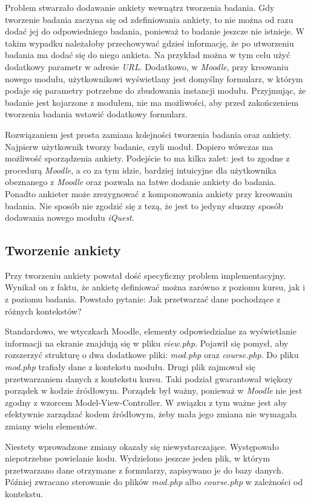 \documentclass[12pt]{article}
\begin{document}
Problem stwarzało dodawanie ankiety wewnątrz tworzenia badania. Gdy tworzenie badania zaczyna się od zdefiniowania ankiety, to nie można od razu dodać jej do odpowiedniego badania, ponieważ to badanie jeszcze nie istnieje. W takim wypadku należałoby przechowywać gdzieś informację, że po utworzeniu badania ma dodać się do niego ankieta. Na przykład można w tym celu użyć dodatkowy parametr w adresie \emph{URL}. Dodatkowo, w \emph{Moodle}, przy kreowaniu nowego modułu, użytkownikowi wyświetlany jest domyślny formularz, w którym podaje się parametry potrzebne do zbudowania instancji modułu. Przyjmując, że badanie jest kojarzone z modułem, nie ma możliwości, aby przed zakończeniem tworzenia badania wstawić dodatkowy formularz.

Rozwiązaniem jest prosta zamiana kolejności tworzenia badania oraz ankiety. Najpierw użytkownik tworzy badanie, czyli moduł. Dopiero wówczas ma możliwość sporządzenia ankiety. Podejście to ma kilka zalet: jest to zgodne z procedurą \emph{Moodle}, a co za tym idzie, bardziej intuicyjne dla użytkownika obeznanego z \emph{Moodle} oraz pozwala na łatwe dodanie ankiety do badania. Ponadto ankieter może zrezygnować z komponowania ankiety przy kreowaniu badania. Nie sposób nie zgodzić się z tezą, że jest to jedyny słuszny sposób dodawania nowego modułu \emph{iQuest}.

\subsection{Tworzenie ankiety}
Przy tworzeniu ankiety powstał dość specyficzny problem implementacyjny. Wynikał on z faktu, że ankietę definiować można zarówno z poziomu kursu, jak i z poziomu badania. Powstało pytanie: Jak przetwarzać dane pochodzące z różnych kontekstów? 

Standardowo, we wtyczkach Moodle, elementy odpowiedzialne za wyświetlanie informacji na ekranie znajdują się w pliku \emph{view.php}. Pojawił się pomysł, aby rozszerzyć strukturę o dwa dodatkowe pliki: \emph{mod.php} oraz \emph{course.php}. Do pliku \emph{mod.php} trafiały dane z kontekstu modułu. Drugi plik zajmował się przetwarzaniem danych z kontekstu kursu. Taki podział gwarantował większy porządek w kodzie źródłowym. Porządek był ważny, ponieważ w \emph{Moodle} nie jest zgodny z wzorcem Model-View-Controller. W związku z tym ważne jest aby efektywnie zarządzać kodem źródłowym, żeby mała jego zmiana nie wymagała zmiany wielu elementów.

Niestety wprowadzone zmiany okazały się niewystarczające. Występowało niepotrzebne powielanie kodu. Wydzielono jeszcze jeden plik, w którym przetwarzano dane otrzymane z formularzy, zapisywano je do bazy danych. Później zwracano sterowanie do plików \emph{mod.php} albo \emph{course.php} w zależności od kontekstu.
\end{document}

